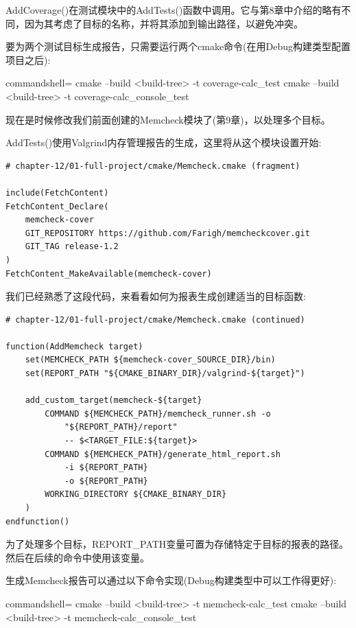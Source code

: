 AddCoverage()在测试模块中的AddTests()函数中调用。它与第8章中介绍的略有不同，因为其考虑了目标的名称，并将其添加到输出路径，以避免冲突。

要为两个测试目标生成报告，只需要运行两个cmake命令(在用Debug构建类型配置项目之后):

\begin{tcblisting}{commandshell={}}
cmake --build <build-tree> -t coverage-calc_test
cmake --build <build-tree> -t coverage-calc_console_test
\end{tcblisting}

现在是时候修改我们前面创建的Memcheck模块了(第9章)，以处理多个目标。


AddTests()使用Valgrind内存管理报告的生成，这里将从这个模块设置开始:

\begin{lstlisting}[style=styleCMake]
# chapter-12/01-full-project/cmake/Memcheck.cmake (fragment)

include(FetchContent)
FetchContent_Declare(
	memcheck-cover
	GIT_REPOSITORY https://github.com/Farigh/memcheckcover.git
	GIT_TAG release-1.2
)
FetchContent_MakeAvailable(memcheck-cover)
\end{lstlisting}

我们已经熟悉了这段代码，来看看如何为报表生成创建适当的目标函数:

\begin{lstlisting}[style=styleCMake]
# chapter-12/01-full-project/cmake/Memcheck.cmake (continued)

function(AddMemcheck target)
	set(MEMCHECK_PATH ${memcheck-cover_SOURCE_DIR}/bin)
	set(REPORT_PATH "${CMAKE_BINARY_DIR}/valgrind-${target}")
	
	add_custom_target(memcheck-${target}
		COMMAND ${MEMCHECK_PATH}/memcheck_runner.sh -o
			"${REPORT_PATH}/report"
			-- $<TARGET_FILE:${target}>
		COMMAND ${MEMCHECK_PATH}/generate_html_report.sh
			-i ${REPORT_PATH}
			-o ${REPORT_PATH}
		WORKING_DIRECTORY ${CMAKE_BINARY_DIR}
	)
endfunction()
\end{lstlisting}

为了处理多个目标，REPORT\_PATH变量可置为存储特定于目标的报表的路径。然后在后续的命令中使用该变量。

生成Memcheck报告可以通过以下命令实现(Debug构建类型中可以工作得更好):

\begin{tcblisting}{commandshell={}}
cmake --build <build-tree> -t memcheck-calc_test
cmake --build <build-tree> -t memcheck-calc_console_test
\end{tcblisting}

